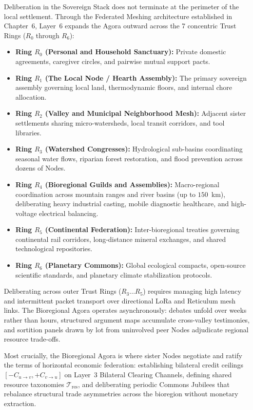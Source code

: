 Deliberation in the Sovereign Stack does not terminate at the perimeter of the local settlement. Through the Federated Meshing architecture established in Chapter~6, Layer~6 expands the Agora outward across the 7 concentric Trust Rings ($R_0$ through $R_6$):
\begin{itemize}
  \item \textbf{Ring $R_0$ (Personal and Household Sanctuary):} Private domestic agreements, caregiver circles, and pairwise mutual support pacts.
  \item \textbf{Ring $R_1$ (The Local Node / Hearth Assembly):} The primary sovereign assembly governing local land, thermodynamic floors, and internal chore allocation.
  \item \textbf{Ring $R_2$ (Valley and Municipal Neighborhood Mesh):} Adjacent sister settlements sharing micro-watersheds, local transit corridors, and tool libraries.
  \item \textbf{Ring $R_3$ (Watershed Congresses):} Hydrological sub-basins coordinating seasonal water flows, riparian forest restoration, and flood prevention across dozens of Nodes.
  \item \textbf{Ring $R_4$ (Bioregional Guilds and Assemblies):} Macro-regional coordination across mountain ranges and river basins (up to $150$~km), deliberating heavy industrial casting, mobile diagnostic healthcare, and high-voltage electrical balancing.
  \item \textbf{Ring $R_5$ (Continental Federation):} Inter-bioregional treaties governing continental rail corridors, long-distance mineral exchanges, and shared technological repositories.
  \item \textbf{Ring $R_6$ (Planetary Commons):} Global ecological compacts, open-source scientific standards, and planetary climate stabilization protocols.
\end{itemize}

Deliberating across outer Trust Rings ($R_3 \dots R_5$) requires managing high latency and intermittent packet transport over directional LoRa and Reticulum mesh links. The Bioregional Agora operates asynchronously: debates unfold over weeks rather than hours, structured argument maps accumulate cross-valley testimonies, and sortition panels drawn by lot from uninvolved peer Nodes adjudicate regional resource trade-offs.

Most crucially, the Bioregional Agora is where sister Nodes negotiate and ratify the terms of horizontal economic federation: establishing bilateral credit ceilings $[-C_{u \to v}, +C_{v \to u}]$ on Layer~3 Bilateral Clearing Channels, defining shared resource taxonomies $\mathcal{T}_{\mathrm{res}}$, and deliberating periodic Commons Jubilees that rebalance structural trade asymmetries across the bioregion without monetary extraction.


